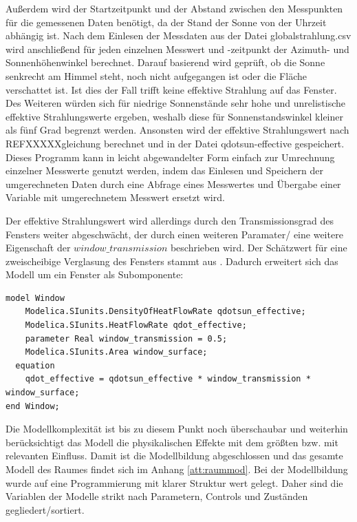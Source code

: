 Außerdem wird der Startzeitpunkt und der Abstand zwischen den Messpunkten für die gemessenen Daten benötigt, da der Stand der Sonne von der Uhrzeit abhängig ist. Nach dem Einlesen der Messdaten aus der Datei globalstrahlung.csv wird anschließend für jeden einzelnen Messwert und -zeitpunkt der Azimuth- und Sonnenhöhenwinkel berechnet. Darauf basierend wird geprüft, ob die Sonne senkrecht am Himmel steht, noch nicht aufgegangen ist oder die Fläche verschattet ist. Ist dies der Fall trifft keine effektive Strahlung auf das Fenster. Des Weiteren würden sich für niedrige Sonnenstände sehr hohe und unrelistische effektive Strahlungswerte ergeben, weshalb diese für Sonnenstandswinkel kleiner als fünf Grad begrenzt werden.
Ansonsten wird der effektive Strahlungswert nach REFXXXXXgleichung berechnet und in der Datei qdotsun-effective gespeichert. Dieses Programm kann in leicht abgewandelter Form einfach zur Umrechnung einzelner Messwerte genutzt werden, indem das Einlesen und Speichern der umgerechneten Daten durch eine Abfrage eines Messwertes und Übergabe einer Variable mit umgerechnetem Messwert ersetzt wird.

Der effektive Strahlungswert wird allerdings durch den Transmissionsgrad des Fensters weiter abgeschwächt, der durch einen weiteren Paramater/ eine weitere Eigenschaft der $window\_transmission$ beschrieben wird. Der Schätzwert für eine zweischeibige Verglasung des Fensters stammt aus \cite[S.~63]{ha13}. Dadurch erweitert sich das Modell um ein Fenster als Subomponente:

\begin{lstlisting}[language=Modelica, caption={Fenster als Subkomponente des Raummodells},label=lst:raumdrei]
model Window
	Modelica.SIunits.DensityOfHeatFlowRate qdotsun_effective;
	Modelica.SIunits.HeatFlowRate qdot_effective;
	parameter Real window_transmission = 0.5;
	Modelica.SIunits.Area window_surface;
  equation
  	qdot_effective = qdotsun_effective * window_transmission * window_surface;
end Window;
\end{lstlisting}

Die Modellkomplexität ist bis zu diesem Punkt noch überschaubar und weiterhin berücksichtigt das Modell die physikalischen Effekte mit dem größten bzw. mit relevanten Einfluss. Damit ist die Modellbildung abgeschlossen und das gesamte Modell des Raumes findet sich im Anhang \ref{att:raummod}. Bei der Modellbildung wurde auf eine Programmierung mit klarer Struktur wert gelegt. Daher sind die Variablen der Modelle strikt nach Parametern, Controls und Zuständen gegliedert/sortiert.

